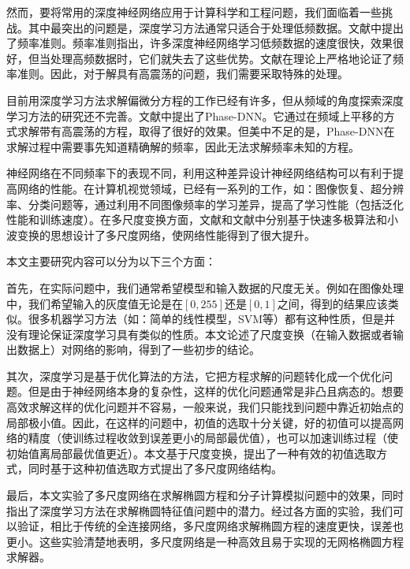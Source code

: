 然而，要将常用的深度神经网络应用于计算科学和工程问题，我们面临着一些挑战。其中最突出的问题是，深度学习方法通常只适合于处理低频数据。文献\cite{xu_training_2018, rahaman2018spectral, xu2019frequency}中提出了频率准则。频率准则指出，许多深度神经网络学习低频数据的速度很快，效果很好，但当处理高频数据时，它们就失去了这些优势。文献\cite{luo2019theory, zhang2019explicitizing, basri2019convergence, cao_towards_2020}在理论上严格地论证了频率准则。因此，对于解具有高震荡的问题，我们需要采取特殊的处理。

目前用深度学习方法求解偏微分方程的工作已经有许多，但从频域的角度探索深度学习方法的研究还不完善。文献\cite{cai2019phasednn}中提出了Phase-DNN。它通过在频域上平移的方式求解带有高震荡的方程，取得了很好的效果。但美中不足的是，Phase-DNN在求解过程中需要事先知道精确解的频率，因此无法求解频率未知的方程。

神经网络在不同频率下的表现不同，利用这种差异设计神经网络结构可以有利于提高网络的性能。在计算机视觉领域，已经有一系列的工作，如：图像恢复\cite{deng2018learning}、超分辨率\cite{pan2018learning}、分类问题\cite{wu2020multigrid}等，通过利用不同图像频率的学习差异，提高了学习性能（包括泛化性能和训练速度）。在多尺度变换方面，文献\cite{Fan2019Hmat}和文献\cite{Fan2019BCR}中分别基于快速多极算法和小波变换的思想设计了多尺度网络，使网络性能得到了很大提升。


本文主要研究内容可以分为以下三个方面：

首先，在实际问题中，我们通常希望模型和输入数据的尺度无关。例如在图像处理中，我们希望输入的灰度值无论是在$[0,255]$还是$[0,1]$之间，得到的结果应该类似。很多机器学习方法（如：简单的线性模型，SVM等）都有这种性质，但是并没有理论保证深度学习具有类似的性质。本文论述了尺度变换（在输入数据或者输出数据上）对网络的影响，得到了一些初步的结论。

其次，深度学习是基于优化算法的方法，它把方程求解的问题转化成一个优化问题。但是由于神经网络本身的复杂性，这样的优化问题通常是非凸且病态的。想要高效求解这样的优化问题并不容易，一般来说，我们只能找到问题中靠近初始点的局部极小值。因此，在这样的问题中，初值的选取十分关键，好的初值可以提高网络的精度（使训练过程收敛到误差更小的局部最优值），也可以加速训练过程（使初始值离局部最优值更近）。本文基于尺度变换，提出了一种有效的初值选取方式，同时基于这种初值选取方式提出了多尺度网络结构。

最后，本文实验了多尺度网络在求解椭圆方程和分子计算模拟问题中的效果，同时指出了深度学习方法在求解椭圆特征值问题中的潜力。经过各方面的实验，我们可以验证，相比于传统的全连接网络，多尺度网络求解椭圆方程的速度更快，误差也更小。这些实验清楚地表明，多尺度网络是一种高效且易于实现的无网格椭圆方程求解器。
